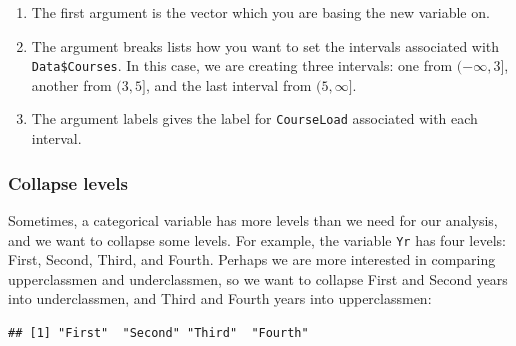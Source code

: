 \documentclass[
]{book}
\newenvironment{Shaded}{\begin{snugshade}}{\end{snugshade}}
\newcommand{\FunctionTok}[1]{\textcolor[rgb]{0.13,0.29,0.53}{\textbf{#1}}}
\newcommand{\NormalTok}[1]{#1}
\newcommand{\OtherTok}[1]{\textcolor[rgb]{0.56,0.35,0.01}{#1}}
\newcommand{\SpecialCharTok}[1]{\textcolor[rgb]{0.81,0.36,0.00}{\textbf{#1}}}
\newcommand{\StringTok}[1]{\textcolor[rgb]{0.31,0.60,0.02}{#1}}
\begin{document}
\begin{enumerate}
\def\labelenumi{\arabic{enumi}.}
\item
  The first argument is the vector which you are basing the new variable on.
\item
  The argument breaks lists how you want to set the intervals associated with \texttt{Data\$Courses}. In this case, we are creating three intervals: one from \((-\infty, 3]\), another from \((3, 5]\), and the last interval from \((5, \infty]\).
\item
  The argument labels gives the label for \texttt{CourseLoad} associated with each interval.
\end{enumerate}

\hypertarget{collapse-levels}{%
\subsubsection{Collapse levels}\label{collapse-levels}}

Sometimes, a categorical variable has more levels than we need for our analysis, and we want to collapse some levels. For example, the variable \texttt{Yr} has four levels: First, Second, Third, and Fourth. Perhaps we are more interested in comparing upperclassmen and underclassmen, so we want to collapse First and Second years into underclassmen, and Third and Fourth years into upperclassmen:

\begin{Shaded}
\end{Shaded}

\begin{verbatim}
## [1] "First"  "Second" "Third"  "Fourth"
\end{verbatim}

\begin{Shaded}
\end{Shaded}
\end{document}
